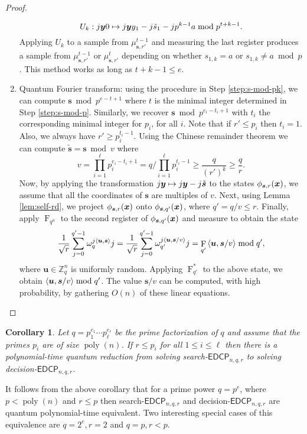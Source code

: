 \documentclass[11pt]{article}
\theoremstyle{plain}
\newtheorem{corollary}[theorem]{Corollary}
\theoremstyle{definition}
\DeclareMathOperator{\poly}{poly}
\DeclareMathOperator{\qft}{F}
\let\ket\relax
\DeclarePairedDelimiter{\ket}{\lvert}{\rangle}
\DeclarePairedDelimiter{\lrang}{\langle}{\rangle}
\def\Z{\mathbb{Z}}
\def\edcp{\mathsf{EDCP}}
\begin{document}
\begin{proof}
\begin{enumerate}[leftmargin = *, font = \bfseries]
    \begin{equation*}
        U_k: \ket{j}\ket{\bm{y}}\ket{0} \mapsto \ket{j}\ket{\bm{y}}\ket{y_1 - j\tilde{s}_1 - jp^{k - 1}a \bmod p^{t + k - 1}}.
    \end{equation*}
    Applying $U_k$ to a sample from $\mu_{\bm{s}, r'}^{t - 1}$ and measuring the last register produces a sample from $\mu_{\bm{s}, r'}^{t - 1}$ or $\mu_{\bm{s}, r'}^t$ depending on whether $s_{1, k} = a$ or $s_{1, k} \ne a \bmod p$. This method works as long as $t + k - 1 \le e$.
    \item Quantum Fourier transform: using the procedure in Step \ref{step:s-mod-pk}, we can compute $\bm{s} \bmod p^{e - t + 1}$ where $t$ is  the minimal integer determined in Step \ref{step:s-mod-p}. Similarly, we recover $\bm{s} \bmod p^{e_i - t_i + 1}$ with $t_i$ the corresponding minimal integer for $p_i$, for all $i$. Note that if $r' \le p_i$ then $t_i = 1$. Also, we always have $r' \ge p_i^{t_i - 1}$. Using the Chinese remainder theorem we can compute $\tilde{\bm{s}} = \bm{s} \bmod v$ where
    \[ v = \prod_{i = 1}^\ell p_i^{e_i - t_i + 1} = q / \prod_{i = 1}^\ell p_i^{t_i - 1} \ge \frac{q}{(r')^k} \ge \frac{q}{r}. \]
    Now, by applying the transformation $\ket{j}\ket{\bm{y}} \mapsto \ket{j}\ket{\bm{y} - j\tilde{\bm{s}}}$ to the states $\ket{\phi_{\bm{s}, r}(\bm{x})}$, we assume that all the coordinates of $\bm{s}$ are multiples of $v$. Next, using Lemma \ref{lem:self-rd}, we project $\ket{\phi_{\bm{s}, r}(\bm{x})}$ onto $\ket{\phi_{\bm{s}, q'}(\bm{x})}$, where $q' = q / v \le r$. Finally, apply $\qft_{q^n}$ to the second register of $\ket{\phi_{\bm{s}, q'}(\bm{x})}$ and measure to obtain the state
    \[ \frac{1}{\sqrt{r}} \sum_{j = 0}^{q' - 1} \omega_q^{j\lrang{\bm{u}, \bm{s}}} \ket{j} = \frac{1}{\sqrt{r}} \sum_{j = 0}^{q' - 1} \omega_{q'}^{j\lrang{\bm{u}, \bm{s} / v}} \ket{j} = \qft_{q'}\ket{\lrang{\bm{u}, \bm{s} / v} \bmod q'}, \]
    where $\bm{u} \in \Z_q^n$ is uniformly random. Applying $\qft_{q'}^*$ to the above state, we obtain $\lrang{\bm{u}, \bm{s} / v} \bmod q'$. The value $\bm{s} / v$ can be computed, with high probability, by gathering $O(n)$ of these linear equations. \qedhere
    \end{enumerate}
\end{proof}
\begin{corollary}
    Let $q = p_1^{e_1} \cdots p_\ell^{e_\ell}$ be the prime factorization of $q$ and assume that the primes $p_i$ are of size $\poly(n)$. If $r \le p_i$ for all $1 \le i \le \ell$ then there is a polynomial-time quantum reduction from solving search-$\edcp_{n, q, r}$ to solving decision-$\edcp_{n, q, r}$. 
\end{corollary}
It follows from the above corollary that for a prime power $q = p^e$, where $p < \poly(n)$ and $r \le p$ then search-$\edcp_{n, q, r}$ and decision-$\edcp_{n, q, r}$ are quantum polynomial-time equivalent. Two interesting special cases of this equivalence are $q = 2^e, r = 2$ and $q = p, r < p$.
\end{document}
